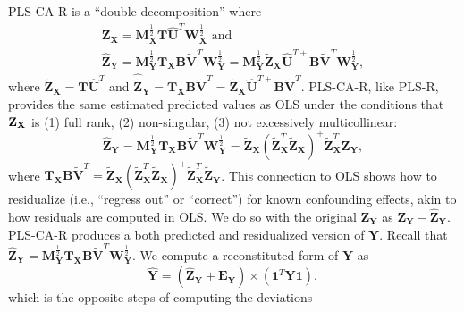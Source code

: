 \documentclass[12pt]{article}
\begin{document}
PLS-CA-R is a ``double decomposition'' where \begin{equation}
\begin{aligned}
{\mathbf Z}_{\mathbf X} = {\mathbf M}^{\frac{1}{2}}_{\mathbf X}{\mathbf T}\widehat{\mathbf U}^{T}{\mathbf W}^{\frac{1}{2}}_{\mathbf X} \text{ and }\\
\widehat{{\mathbf Z}}_{\mathbf Y} = {\mathbf M}^{\frac{1}{2}}_{\mathbf Y}{\mathbf T}_{\mathbf X}{\mathbf B}\widetilde{\mathbf V}^{T}{\mathbf W}^{\frac{1}{2}}_{\mathbf Y} = {\mathbf M}^{\frac{1}{2}}_{\mathbf Y}\widetilde{\mathbf Z}_{\mathbf X}\widehat{\mathbf U}^{{T}{+}}{\mathbf B}\widetilde{\mathbf V}^{T}{\mathbf W}^{\frac{1}{2}}_{\mathbf Y},
\label{eq:doubledecomp}
\end{aligned}
\end{equation} where
\(\widetilde{\mathbf Z}_{\mathbf X} = {\mathbf T}\widehat{\mathbf U}^{T}\)
and
\(\widehat{\widetilde{\mathbf Z}}_{\mathbf Y} = {\mathbf T}_{\mathbf X}{\mathbf B}\widetilde{\mathbf V}^{T} = \widetilde{\mathbf Z}_{\mathbf X}\widehat{\mathbf U}^{{T}{+}}{\mathbf B}\widetilde{\mathbf V}^{T}\).
PLS-CA-R, like PLS-R, provides the same estimated predicted values as
OLS under the conditions that \({\bf Z}_{\bf X}\) is (1) full rank, (2)
non-singular, (3) not excessively multicollinear: \begin{equation}
\widehat{{\mathbf Z}}_{\mathbf Y} = {\mathbf M}^{\frac{1}{2}}_{\mathbf Y}{\mathbf T}_{\mathbf X}{\mathbf B}\widetilde{\mathbf V}^{T}{\mathbf W}^{\frac{1}{2}}_{\mathbf Y} = \widetilde{\mathbf Z}_{\mathbf X} (\widetilde{\mathbf Z}_{\mathbf X}^{T}\widetilde{\mathbf Z}_{\mathbf X})^{+} \widetilde{\mathbf Z}_{\mathbf X}^T {\mathbf Z}_{\mathbf Y},
\label{ols_equivalence}
\end{equation} where
\({\mathbf T}_{\mathbf X}{\mathbf B}\widetilde{\mathbf V}^{T} = \widetilde{\mathbf Z}_{\mathbf X} (\widetilde{\mathbf Z}_{\mathbf X}^{T}\widetilde{\mathbf Z}_{\mathbf X})^{+} \widetilde{\mathbf Z}_{\mathbf X}^T\widetilde{\mathbf Z}_{\mathbf Y}\).
This connection to OLS shows how to residualize (i.e., ``regress out''
or ``correct'') for known confounding effects, akin to how residuals are
computed in OLS. We do so with the original \({\mathbf Z}_{\mathbf Y}\)
as \({\mathbf Z}_{\mathbf Y} - \widehat{\mathbf Z}_{\mathbf Y}\).
PLS-CA-R produces a both predicted and residualized version of
\({\mathbf Y}\). Recall that
\(\widehat{{\mathbf Z}}_{\mathbf Y} = {\mathbf M}^{\frac{1}{2}}_{\mathbf Y}{\mathbf T}_{\mathbf X}{\mathbf B}\widetilde{\mathbf V}^{T}{\mathbf W}^{\frac{1}{2}}_{\mathbf Y}\).
We compute a reconstituted form of \({\mathbf Y}\) as \begin{equation}
\widehat{\mathbf Y} = (\widehat{{\mathbf Z}}_{\mathbf Y} + {\mathbf E}_{\mathbf Y}) \times ({\mathbf 1}^{T}{\mathbf Y}{\mathbf 1}),
\label{eq:Yhat}
\end{equation} which is the opposite steps of computing the deviations
\end{document}
